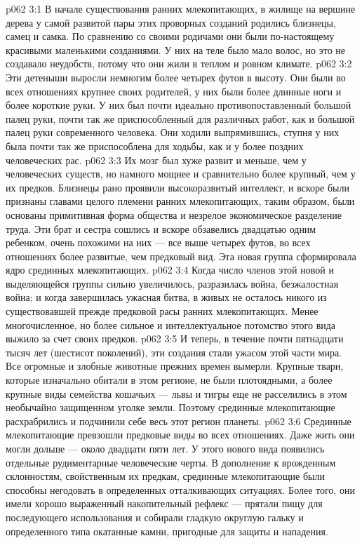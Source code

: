 \vs p062 3:1 В начале существования ранних млекопитающих, в жилище на вершине дерева у самой развитой пары этих проворных созданий родились близнецы, самец и самка. По сравнению со своими родичами они были по\hyp{}настоящему красивыми маленькими созданиями. У них на теле было мало волос, но это не создавало неудобств, потому что они жили в теплом и ровном климате.
\vs p062 3:2 Эти детеныши выросли немногим более четырех футов в высоту. Они были во всех отношениях крупнее своих родителей, у них были более длинные ноги и более короткие руки. У них был почти идеально противопоставленный большой палец руки, почти так же приспособленный для различных работ, как и большой палец руки современного человека. Они ходили выпрямившись, ступня у них была почти так же приспособлена для ходьбы, как и у более поздних человеческих рас.
\vs p062 3:3 Их мозг был хуже развит и меньше, чем у человеческих существ, но намного мощнее и сравнительно более крупный, чем у их предков. Близнецы рано проявили высокоразвитый интеллект, и вскоре были признаны главами целого племени ранних млекопитающих, таким образом, были основаны примитивная форма общества и незрелое экономическое разделение труда. Эти брат и сестра сошлись и вскоре обзавелись двадцатью одним ребенком, очень похожими на них --- все выше четырех футов, во всех отношениях более развитые, чем предковый вид. Эта новая группа сформировала ядро срединных млекопитающих.
\vs p062 3:4 Когда число членов этой новой и выделяющейся группы сильно увеличилось, разразилась война, безжалостная война; и когда завершилась ужасная битва, в живых не осталось никого из существовавшей прежде предковой расы ранних млекопитающих. Менее многочисленное, но более сильное и интеллектуальное потомство этого вида выжило за счет своих предков.
\vs p062 3:5 И теперь, в течение почти пятнадцати тысяч лет (шестисот поколений), эти создания стали ужасом этой части мира. Все огромные и злобные животные прежних времен вымерли. Крупные твари, которые изначально обитали в этом регионе, не были плотоядными, а более крупные виды семейства кошачьих --- львы и тигры еще не расселились в этом необычайно защищенном уголке земли. Поэтому срединные млекопитающие расхрабрились и подчинили себе весь этот регион планеты.
\vs p062 3:6 \pc Срединные млекопитающие превзошли предковые виды во всех отношениях. Даже жить они могли дольше --- около двадцати пяти лет. У этого нового вида появились отдельные рудиментарные человеческие черты. В дополнение к врожденным склонностям, свойственным их предкам, срединные млекопитающие были способны негодовать в определенных отталкивающих ситуациях. Более того, они имели хорошо выраженный накопительный рефлекс --- прятали пищу для последующего использования и собирали гладкую округлую гальку и определенного типа окатанные камни, пригодные для защиты и нападения.
